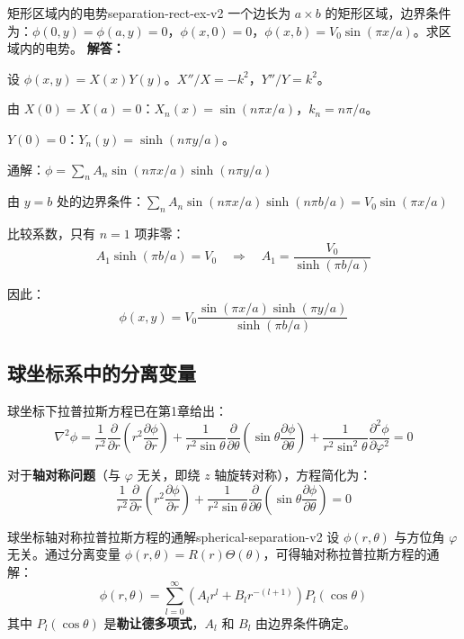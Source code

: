 \documentclass[11pt,a4paper,openany,oneside]{book}
\newcommand{\lap}{\nabla^2}
\newcommand{\difficulty}[1]{\marginnote{\textcolor{red}{\textbf{[#1]}}}}
\begin{document}
\begin{example}{矩形区域内的电势}{separation-rect-ex-v2}
\difficulty{提高}
一个边长为 $a \times b$ 的矩形区域，边界条件为：$\phi(0,y) = \phi(a,y) = 0$，$\phi(x,0) = 0$，$\phi(x,b) = V_0\sin(\pi x/a)$。求区域内的电势。
\tcblower
\textbf{解答：}

设 $\phi(x,y) = X(x)Y(y)$。$X''/X = -k^2$，$Y''/Y = k^2$。

由 $X(0) = X(a) = 0$：$X_n(x) = \sin(n\pi x/a)$，$k_n = n\pi/a$。

$Y(0) = 0$：$Y_n(y) = \sinh(n\pi y/a)$。

通解：$\phi = \sum_n A_n \sin(n\pi x/a)\sinh(n\pi y/a)$

由 $y=b$ 处的边界条件：$\sum_n A_n\sin(n\pi x/a)\sinh(n\pi b/a) = V_0\sin(\pi x/a)$

比较系数，只有 $n=1$ 项非零：
\[
A_1\sinh(\pi b/a) = V_0 \quad\Rightarrow\quad A_1 = \frac{V_0}{\sinh(\pi b/a)}
\]

因此：
\[
\phi(x,y) = V_0 \frac{\sin(\pi x/a)\sinh(\pi y/a)}{\sinh(\pi b/a)}
\]
\end{example}

\subsection{球坐标系中的分离变量}

球坐标下拉普拉斯方程已在第1章给出：
\[
\lap\phi = \frac{1}{r^2}\frac{\partial}{\partial r}\left(r^2\frac{\partial\phi}{\partial r}\right)
+ \frac{1}{r^2\sin\theta}\frac{\partial}{\partial\theta}\left(\sin\theta\frac{\partial\phi}{\partial\theta}\right)
+ \frac{1}{r^2\sin^2\theta}\frac{\partial^2\phi}{\partial\varphi^2} = 0
\]

对于\textbf{轴对称问题}（与 $\varphi$ 无关，即绕 $z$ 轴旋转对称），方程简化为：
\[
\frac{1}{r^2}\frac{\partial}{\partial r}\left(r^2\frac{\partial\phi}{\partial r}\right)
+ \frac{1}{r^2\sin\theta}\frac{\partial}{\partial\theta}\left(\sin\theta\frac{\partial\phi}{\partial\theta}\right) = 0
\]

\begin{theorem}{球坐标轴对称拉普拉斯方程的通解}{spherical-separation-v2}
设 $\phi(r,\theta)$ 与方位角 $\varphi$ 无关。通过分离变量 $\phi(r,\theta) = R(r)\Theta(\theta)$，可得轴对称拉普拉斯方程的通解：
\[
\phi(r,\theta) = \sum_{l=0}^{\infty}\left(A_l r^l + B_l r^{-(l+1)}\right)P_l(\cos\theta)
\]
其中 $P_l(\cos\theta)$ 是\textbf{勒让德多项式}，$A_l$ 和 $B_l$ 由边界条件确定。
\end{theorem}
\end{document}
